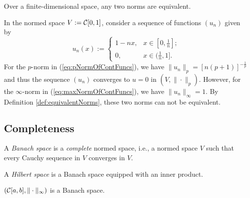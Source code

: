 \begin{coro}
  \label{coro:normEquivalenceFiniteDim}
  Over a finite-dimensional space,
  any two norms are equivalent.
\end{coro}

\begin{exm}
  In the normed space $V:= {\cal C}[0,1]$, 
  consider a sequence of functions
  $(u_n)$ given by
  \begin{displaymath}
    u_n(x) :=
    \begin{cases}
      1-nx, & x\in [0,\frac{1}{n}];
      \\
      0, & x\in (\frac{1}{n}, 1].
    \end{cases}
  \end{displaymath}
  For the $p$-norm in (\ref{eq:pNormOfContFuncs}),
  we have $\|u_n\|_p = [n(p+1)]^{-\frac{1}{p}}$
  and thus the sequence $(u_n)$ converges
  to $u=0$ in $(V,\|\cdot\|_p)$.
  However, for the $\infty$-norm in (\ref{eq:maxNormOfContFuncs}),
  we have $\|u_n\|_{\infty} = 1$.
  By Definition \ref{def:equivalentNorms}, 
  these two norms can not be equivalent. 
\end{exm}

\subsection{Completeness}

\begin{defn}
  \label{def:BanachSpace}  
  A \emph{Banach space} is a \emph{complete} normed space, 
  i.e., a normed space $V$ such that
  every Cauchy sequence in $V$ converges in $V$.
\end{defn}

\begin{defn}
  A \emph{Hilbert space} is a Banach space equipped with an inner product.
\end{defn}

\begin{thm}
  \label{thm:contFuncWithInftyNormIsComplete}
  $\left({\cal C}[a,b], \|\cdot\|_{\infty}\right)$
  is a Banach space.
\end{thm}

